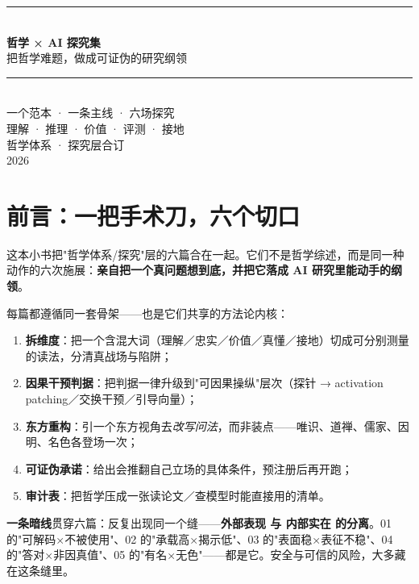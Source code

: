 \documentclass[11pt,a4paper,oneside,fontset=none]{ctexbook}
\begin{document}
\begin{titlepage}
\thispagestyle{empty}
\centering
\vspace*{3cm}
{\color{rule}\rule{0.55\textwidth}{1pt}}\\[1.2cm]
{\Huge\hei\bfseries\color{ink} 哲学 × AI 探究集}\\[0.8cm]
{\LARGE\notolight\color{accent} 把哲学难题，做成可证伪的研究纲领}\\[1.2cm]
{\color{rule}\rule{0.55\textwidth}{1pt}}\\[2.4cm]
{\large\notolight\color{ink!80} 一个范本 · 一条主线 · 六场探究\\[0.5em]
理解 · 推理 · 价值 · 评测 · 接地}\\[3.2cm]
{\normalsize\color{gray} 哲学体系 · 探究层合订}\\[0.3em]
{\small\color{gray} 2026}
\end{titlepage}

\frontmatter
\pagestyle{fancy}

\chapter*{前言：一把手术刀，六个切口}

这本小书把"哲学体系/探究"层的六篇合在一起。它们不是哲学综述，而是同一种动作的六次施展：\textbf{亲自把一个真问题想到底，并把它落成 AI 研究里能动手的纲领}。

每篇都遵循同一套骨架——也是它们共享的方法论内核：

\begin{enumerate}
\item \textbf{拆维度}：把一个含混大词（理解／忠实／价值／真懂／接地）切成可分别测量的读法，分清真战场与陷阱；
\item \textbf{因果干预判据}：把判据一律升级到"可因果操纵"层次（探针 → activation patching／交换干预／引导向量）；
\item \textbf{东方重构}：引一个东方视角去\emph{改写问法}，而非装点——唯识、道禅、儒家、因明、名色各登场一次；
\item \textbf{可证伪承诺}：给出会推翻自己立场的具体条件，预注册后再开跑；
\item \textbf{审计表}：把哲学压成一张读论文／查模型时能直接用的清单。
\end{enumerate}

\noindent\textbf{一条暗线}贯穿六篇：反复出现同一个缝——\textbf{外部表现 与 内部实在 的分离}。01 的"可解码×不被使用"、02 的"承载高×揭示低"、03 的"表面稳×表征不稳"、04 的"答对×非因真值"、05 的"有名×无色"——都是它。安全与可信的风险，大多藏在这条缝里。
\end{document}
